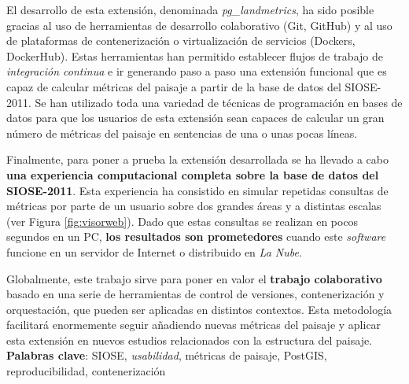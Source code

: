 \begin{resumen}
El desarrollo de esta extensión, denominada \textit{pg\_landmetrics}, ha sido posible gracias al uso de herramientas de desarrollo colaborativo (Git, GitHub) y al uso de plataformas de contenerización o virtualización de servicios (Dockers, DockerHub). Estas herramientas han permitido establecer flujos de trabajo de \textit{integración continua} e ir generando paso a paso una extensión funcional que es capaz de calcular métricas del paisaje a partir de la base de datos del SIOSE-2011. Se han utilizado toda una variedad de técnicas de programación en bases de datos para que los usuarios de esta extensión sean capaces de calcular un gran número de métricas del paisaje en sentencias de una o unas pocas líneas.

Finalmente, para poner a prueba la extensión desarrollada se ha llevado a cabo \textbf{una experiencia computacional completa sobre la base de datos del SIOSE-2011}. Esta experiencia ha consistido en simular repetidas consultas de métricas por parte de un usuario sobre dos grandes áreas y a distintas escalas (ver Figura \ref{fig:visorweb}). Dado que estas consultas se realizan en pocos segundos en un PC, \textbf{los resultados son prometedores} cuando este \textit{software} funcione en un servidor de Internet o distribuido en \textit{La Nube}.

Globalmente, este trabajo sirve para poner en valor el \textbf{trabajo colaborativo} basado en una serie de herramientas de control de versiones, contenerización y orquestación, que pueden ser aplicadas en distintos contextos. Esta metodología facilitará enormemente seguir añadiendo nuevas métricas del paisaje y aplicar esta extensión en nuevos estudios relacionados con la estructura del paisaje.\\


\textbf{Palabras clave}: SIOSE, \textit{usabilidad}, métricas de paisaje, PostGIS, reproducibilidad, contenerización


\end{resumen}
